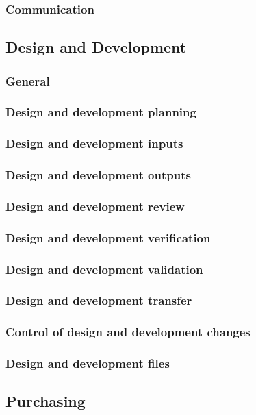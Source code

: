 \documentclass{article}
\begin{document}
\subsubsection{Communication}
\subsection{Design and Development}
\subsubsection{General}
\subsubsection{Design and development planning}
\subsubsection{Design and development inputs}
\subsubsection{Design and development outputs}
\subsubsection{Design and development review}
\subsubsection{Design and development verification}
\subsubsection{Design and development validation}
\subsubsection{Design and development transfer}
\subsubsection{Control of design and development changes}
\subsubsection{Design and development files}
\subsection{Purchasing}
\end{document}
